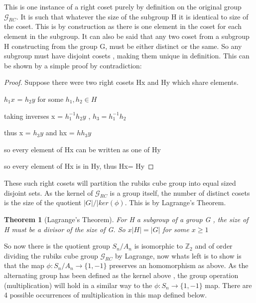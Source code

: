 \documentclass{article}
\newtheorem{theorem}{Theorem}[section]
\begin{document}
\begin{figure}[hbt]
\centering%
  \RubikCubeSolved%
    \hspace{.4cm}
    \quad{}%
    \hspace{.4cm}
  	\hspace{.4cm}
    \quad{}%
    \hspace{.4cm}
   	\hspace{.4cm}
    \quad{}%
    \hspace{.4cm}
\end{figure}
This is one instance of a right coset purely by definition on the original group $\mathcal{G}_{RC}$. It is such that whatever the size of the subgroup H it is identical to size of the coset. This is by construction as there is one element in the coset for each element in the subgroup.
It can also be said that any two coset from a subgroup H constructing from the group G, must be either distinct or the same. So any subgroup must have disjoint cosets , making them unique in definition. This can be shown by a simple proof by contradiction:
\begin{proof}
\item Suppose there were two right cosets Hx and Hy which share elements.
\item $h_{1}x$ = $h_{2}y$ for some $h_{1},h_{2} \in H$
\item taking inverses x = $h_{1}^{-1}h_{2}y$ , $h_{3} = h_{1}^{-1}h_{2}$
\item thus x = $h_{3}y$ and hx = $hh_{3}y$
\item so every element of Hx can be written as one of Hy
\item so every element of Hx is in Hy, thus Hx= Hy
\end{proof} These such right cosets will partition the rubiks cube group into equal sized disjoint sets. As the kernel of $\mathcal{G}_{RC}$ is a group itself, the number of distinct cosets is the size of the quotient $|G|/|ker(\phi)$. This is by Lagrange's Theorem.
\begin{theorem}[Lagrange's Theorem]
\label{Lagrange}
For H a subgroup of a group G , the size of H must be a divisor of the size of G.
So $x|H| = |G|$ for some $x\geq1$
\end{theorem}So now there is the quotient group $S_{n}/A_{n}$ is isomorphic to $\mathbb{Z}_{2}$ and of order dividing the rubiks cube group $\mathcal{G}_{RC}$ by Lagrange, now whats left is to show is that the map $\phi : S_{n}/A_{n} \rightarrow \{1,-1\}$ preserves an homomorphism as above. As the alternating group has been defined as the kernel above , the group operation (multiplication) will hold in a similar way to the $\phi : S_{n} \rightarrow \{1,-1\}$ map. There are 4 possible occurrences of multiplication in this map defined below.
\end{document}
